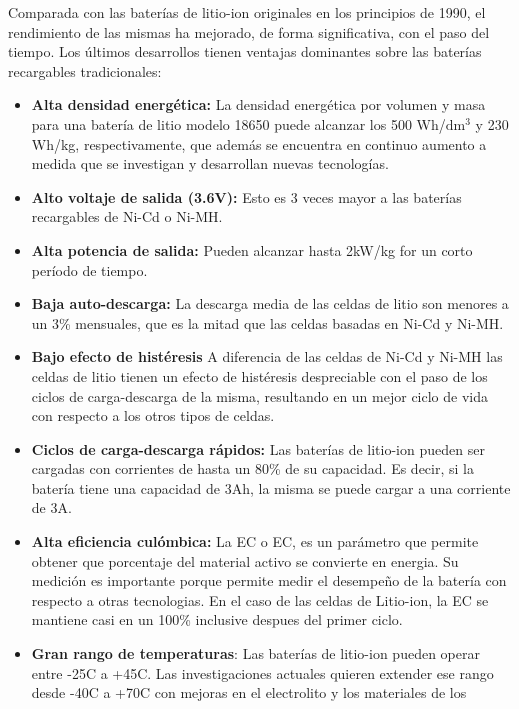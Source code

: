 \documentclass[10pt,a4paper]{article}
\begin{document}
\noindent Comparada con las baterías de litio-ion originales en los principios 
de 1990, el rendimiento de las mismas ha mejorado, de forma significativa, con 
el paso del tiempo. Los últimos desarrollos tienen ventajas dominantes sobre 
las baterías recargables tradicionales:

\begin{itemize}
    \item \textbf{Alta densidad energética:} La densidad energética por
	volumen y masa para una batería de litio modelo 18650 puede alcanzar
	los 500 Wh/$\mathrm{dm^3}$ y 230 Wh/kg, respectivamente, que adem\'as
	se encuentra en continuo aumento a medida que se investigan y
	desarrollan nuevas tecnologías.
    \item \textbf{Alto voltaje de salida (3.6V):} Esto es 3 veces 
        mayor a las baterías recargables de Ni-Cd o Ni-MH.
    \item \textbf{Alta potencia de salida:} Pueden alcanzar hasta 2kW/kg for
	un corto per\'iodo de tiempo.
    \item \textbf{Baja auto-descarga:} La descarga media de las celdas de
	litio son menores a un 3\% mensuales, que es la mitad que las celdas
	basadas en Ni-Cd y Ni-MH.
    \item \textbf{Bajo efecto de histéresis} A diferencia de las celdas de
	Ni-Cd y Ni-MH las celdas de litio tienen un efecto de histéresis
	despreciable con el paso de los ciclos de carga-descarga de la
	misma, resultando en un mejor ciclo de vida con respecto a los otros
	tipos de celdas.
    \item \textbf{Ciclos de carga-descarga rápidos:} Las baterías de
	litio-ion pueden ser cargadas con corrientes de hasta un 80\% de su
	capacidad. Es decir, si la batería tiene una capacidad de 3Ah, la
	misma se puede cargar a una corriente de 3A.
    \item \textbf{Alta eficiencia cul\'ombica:} La \acrlong{EC} o \acrshort{EC},
	es un par\'ametro que permite obtener que porcentaje del material
	activo se convierte en energia. Su medici\'on es importante porque 
	permite medir el desempeño de la bater\'ia con respecto a otras 
    tecnologias. En el caso de las celdas de Litio-ion, la \acrlong{EC}
	se mantiene casi en un 100\% inclusive despues del primer ciclo.
    \item \textbf{Gran rango de temperaturas}: Las bater\'ias de litio-ion
	pueden operar entre -25\degree C a +45\degree C. Las
	investigaciones actuales quieren extender ese rango desde -40\degree C a 
    +70\degree C con mejoras en el electrolito y los materiales de los 

\end{itemize}
\end{document}
